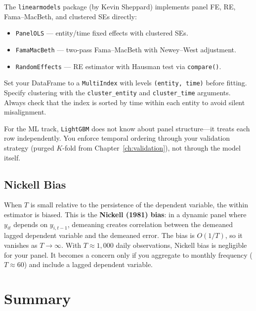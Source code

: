 \begin{prereq}
The \texttt{linearmodels} package (by Kevin Sheppard) implements panel FE, RE, Fama--MacBeth, and clustered SEs directly:
\begin{itemize}[leftmargin=*]
  \item \texttt{PanelOLS} --- entity/time fixed effects with clustered SEs.
  \item \texttt{FamaMacBeth} --- two-pass Fama--MacBeth with Newey--West adjustment.
  \item \texttt{RandomEffects} --- RE estimator with Hausman test via \texttt{compare()}.
\end{itemize}
Set your DataFrame to a \texttt{MultiIndex} with levels \texttt{(entity, time)} before fitting.
Specify clustering with the \texttt{cluster\_entity} and \texttt{cluster\_time} arguments.
Always check that the index is sorted by time within each entity to avoid silent misalignment.

For the ML track, \texttt{LightGBM} does not know about panel structure---it treats each row independently.
You enforce temporal ordering through your validation strategy (purged $K$-fold from Chapter~\ref{ch:validation}), not through the model itself.
\end{prereq}

\subsection{Nickell Bias}

When $T$ is small relative to the persistence of the dependent variable, the within estimator is biased.
This is the \textbf{Nickell (1981) bias}: in a dynamic panel where $y_{it}$ depends on $y_{i,t-1}$, demeaning creates correlation between the demeaned lagged dependent variable and the demeaned error.
The bias is $O(1/T)$, so it vanishes as $T \to \infty$.
With $T \approx 1{,}000$ daily observations, Nickell bias is negligible for your panel.
It becomes a concern only if you aggregate to monthly frequency ($T \approx 60$) and include a lagged dependent variable.

\section{Summary}
\label{sec:panel-summary}

